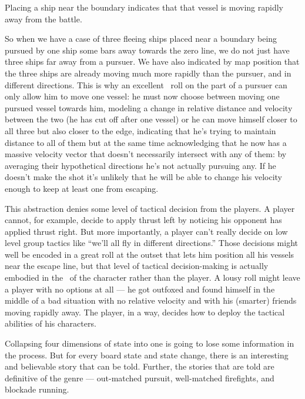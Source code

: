 Placing a ship near the boundary indicates that that vessel is moving rapidly away from the battle.

So when we have a case of three fleeing ships placed near a boundary being pursued by one ship some bars away towards the zero line, we do not just have three ships far away from a pursuer. We have also indicated by map position that the three ships are already moving much more rapidly than the pursuer, and in different directions. This is why an excellent \Vshift\ roll on the part of a pursuer can only allow him to move one vessel: he must now choose between moving one pursued vessel towards him, modeling a change in relative distance and velocity between the two (he has cut off after one vessel) or he can move himself closer to all three but also closer to the edge, indicating that he's trying to maintain distance to all of them but at the same time acknowledging that he now has a massive velocity vector that doesn't necessarily intersect with any of them: by averaging their hypothetical directions he's not actually pursuing any. If he doesn't make the shot it's unlikely that he will be able to change his velocity enough to keep at least one from escaping.

This abstraction denies some level of tactical decision from the players. A player cannot, for example, decide to apply thrust left by noticing his opponent has applied thrust right. But more importantly, a player can't really decide on low level group tactics like ``we'll all fly in different directions.'' Those decisions might well be encoded in a great  roll at the outset that lets him position all his vessels near the escape line, but that level of tactical decision-making is actually embodied in the \Skill\ of the character rather than the player. A lousy  roll might leave a player with no options at all --- he got outfoxed and found himself in the middle of a bad situation with no relative velocity and with his (smarter) friends moving rapidly away. The player, in a way, decides how to deploy the tactical abilities of his characters.

Collapsing four dimensions of state into one is going to lose some information in the process. But for every board state and state change, there is an interesting and believable story that can be told. Further, the stories that are told are definitive of the genre --- out-matched pursuit, well-matched firefights, and blockade running.

